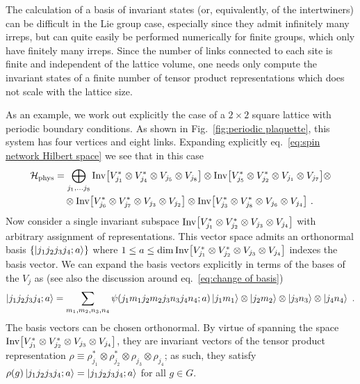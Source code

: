 The calculation of a basis of invariant states (or, equivalently, of the intertwiners) can be difficult in the Lie group case, especially since they admit infinitely many irreps, but can quite easily be performed numerically for finite groups, which only have finitely many irreps.
Since the number of links connected to each site is finite and independent of the lattice volume, one needs only compute the invariant states of a finite number of tensor product representations which does not scale with the lattice size.

As an example, we work out explicitly the case of a $2\times 2$ square lattice with periodic boundary conditions.
As shown in Fig.~\ref{fig:periodic plaquette}, this system has four vertices and eight links.
Expanding explicitly eq.~\eqref{eq:spin network Hilbert space} we see that in this case
\begin{align}
    \mathcal{H}_{\mathrm{phys}} &= \bigoplus_{j_1, \ldots j_8}
    \mathrm{Inv}\bqty{V_{j_1}^* \otimes V_{j_4}^* \otimes V_{j_5} \otimes V_{j_8}} \otimes
    \mathrm{Inv}\bqty{V_{j_5}^* \otimes V_{j_2}^* \otimes V_{j_1} \otimes V_{j_7}}  \otimes \\
    &\quad\otimes\mathrm{Inv}\bqty{V_{j_6}^* \otimes V_{j_7}^* \otimes V_{j_3} \otimes V_{j_2}} \otimes
    \mathrm{Inv}\bqty{V_{j_3}^* \otimes V_{j_8}^* \otimes V_{j_6} \otimes V_{j_4}} \ . \nonumber
\end{align}
Now consider a single invariant subspace $\mathrm{Inv}\bqty{V_{j_1}^* \otimes V_{j_2}^* \otimes V_{j_3} \otimes V_{j_4}}$ with arbitrary assignment of representations.
This vector space admits an orthonormal basis $\{\ket{j_1 j_2 j_3 j_4 ; a}\}$ where $1 \leq a \leq \dim\mathrm{Inv}\bqty{V_{j_1}^* \otimes V_{j_2}^* \otimes V_{j_3} \otimes V_{j_4}}$ indexes the basis vector.
We can expand the basis vectors explicitly in terms of the bases of the $V_j$ as (see also the discussion around eq.~\eqref{eq:change of basis})
\begin{equation}
    \ket{j_1 j_2 j_3 j_4 ; a} = \sum_{m_1, m_2, n_3, n_4} \psi\pqty{j_1 m_1 j_2 m_2 j_3 n_3 j_4 n_4 ; a} \ket{j_1 m_1} \otimes \ket{j_2 m_2} \otimes \ket{j_3 n_3} \otimes \ket{j_4 n_4} \ .
\end{equation}
The basis vectors can be chosen orthonormal.
By virtue of spanning the space $\mathrm{Inv}\bqty{V_{j_1}^* \otimes V_{j_2}^* \otimes V_{j_3} \otimes V_{j_4}}$, they are invariant vectors of the tensor product representation $\rho \equiv \rho_{j_1}^* \otimes \rho_{j_2}^* \otimes \rho_{j_3} \otimes \rho_{j_4}$; as such, they satisfy $\rho(g) \ket{j_1 j_2 j_3 j_4 ; a} = \ket{j_1 j_2 j_3 j_4 ; a}$ for all $g \in G$.
